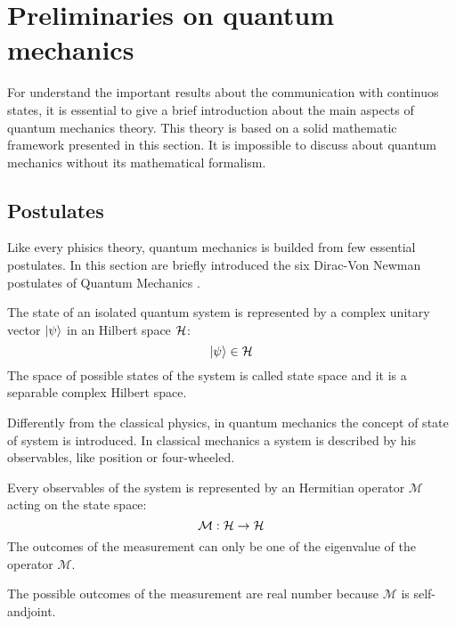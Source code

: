 \section{Preliminaries on quantum mechanics}
    For understand the important results about the communication with continuos
    states, it is essential to give a brief introduction about the main aspects 
    of quantum mechanics theory.
    This theory is based on a solid mathematic framework presented in this section.
    It is impossible to discuss about quantum mechanics without its mathematical 
    formalism.
    
    \subsection{Postulates}
    Like every phisics theory, quantum mechanics is builded from few 
    essential postulates.
    In this section are briefly introduced the six Dirac-Von Newman 
    postulates of Quantum Mechanics \cite{quantumMec_Dirac,quantumMec_Neumann}.

    \begin{postulate}
        The state of an isolated quantum system is represented by a complex unitary 
        vector $\ket{\psi}$ in an Hilbert space $\mathcal{H}$:
        \begin{equation*}
            \ket{\psi} \in \mathcal{H}
        \end{equation*}
        The space of possible states of the system is called state space and it is a
        separable complex Hilbert space.
        \label{post:1}
    \end{postulate}
    \begin{observation*}
        Differently from the classical physics, in quantum mechanics the concept
        of state of system is introduced. In classical mechanics a system is 
        described by his observables, like position or four-wheeled.
    \end{observation*}
    
    \begin{postulate}[Observables]
        Every observables of the system is represented by an Hermitian operator $\mathcal{M}$
        acting on the state space:
        \begin{equation*}
            \mathcal{M}:\mathcal{H}\to\mathcal{H}
        \end{equation*}
        The outcomes of the measurement can only be one of the eigenvalue of the 
        operator $\mathcal{M}$.
        \label{post:2}
    \end{postulate}
    \begin{observation*}
        The possible outcomes of the measurement are real number because $\mathcal{M}$
        is self-andjoint. 
    \end{observation*}


